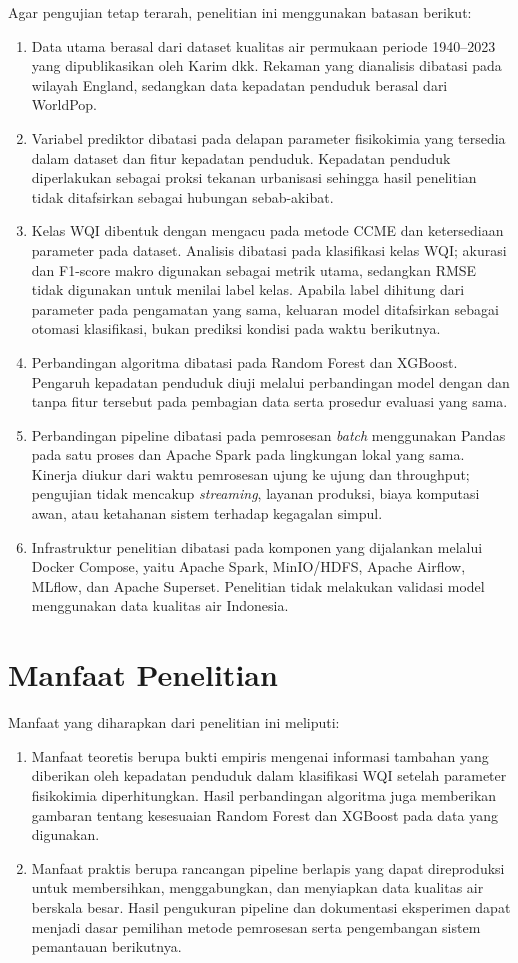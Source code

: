 Agar pengujian tetap terarah, penelitian ini menggunakan batasan berikut:
\begin{enumerate}
    \item Data utama berasal dari dataset kualitas air permukaan periode 1940--2023 yang dipublikasikan oleh Karim dkk. Rekaman yang dianalisis dibatasi pada wilayah England, sedangkan data kepadatan penduduk berasal dari WorldPop.
    \item Variabel prediktor dibatasi pada delapan parameter fisikokimia yang tersedia dalam dataset dan fitur kepadatan penduduk. Kepadatan penduduk diperlakukan sebagai proksi tekanan urbanisasi sehingga hasil penelitian tidak ditafsirkan sebagai hubungan sebab-akibat.
    \item Kelas WQI dibentuk dengan mengacu pada metode CCME dan ketersediaan parameter pada dataset. Analisis dibatasi pada klasifikasi kelas WQI; akurasi dan F1-score makro digunakan sebagai metrik utama, sedangkan RMSE tidak digunakan untuk menilai label kelas. Apabila label dihitung dari parameter pada pengamatan yang sama, keluaran model ditafsirkan sebagai otomasi klasifikasi, bukan prediksi kondisi pada waktu berikutnya.
    \item Perbandingan algoritma dibatasi pada Random Forest dan XGBoost. Pengaruh kepadatan penduduk diuji melalui perbandingan model dengan dan tanpa fitur tersebut pada pembagian data serta prosedur evaluasi yang sama.
    \item Perbandingan pipeline dibatasi pada pemrosesan \textit{batch} menggunakan Pandas pada satu proses dan Apache Spark pada lingkungan lokal yang sama. Kinerja diukur dari waktu pemrosesan ujung ke ujung dan throughput; pengujian tidak mencakup \textit{streaming}, layanan produksi, biaya komputasi awan, atau ketahanan sistem terhadap kegagalan simpul.
    \item Infrastruktur penelitian dibatasi pada komponen yang dijalankan melalui Docker Compose, yaitu Apache Spark, MinIO/HDFS, Apache Airflow, MLflow, dan Apache Superset. Penelitian tidak melakukan validasi model menggunakan data kualitas air Indonesia.
\end{enumerate}

\section{Manfaat Penelitian}

Manfaat yang diharapkan dari penelitian ini meliputi:
\begin{enumerate}
    \item Manfaat teoretis berupa bukti empiris mengenai informasi tambahan yang diberikan oleh kepadatan penduduk dalam klasifikasi WQI setelah parameter fisikokimia diperhitungkan. Hasil perbandingan algoritma juga memberikan gambaran tentang kesesuaian Random Forest dan XGBoost pada data yang digunakan.
    \item Manfaat praktis berupa rancangan pipeline berlapis yang dapat direproduksi untuk membersihkan, menggabungkan, dan menyiapkan data kualitas air berskala besar. Hasil pengukuran pipeline dan dokumentasi eksperimen dapat menjadi dasar pemilihan metode pemrosesan serta pengembangan sistem pemantauan berikutnya.
\end{enumerate}
